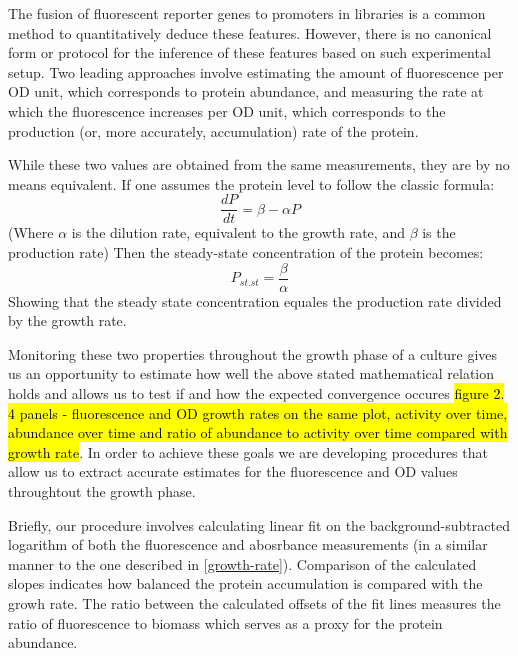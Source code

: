 \documentclass{report}
\begin{document}
The fusion of fluorescent reporter genes to promoters in libraries is a common method to quantitatively deduce these features.
However, there is no canonical form or protocol for the inference of these features based on such experimental setup.
Two leading approaches involve estimating the amount of fluorescence per OD unit, which corresponds to protein abundance, and measuring the rate at which the fluorescence increases per OD unit, which corresponds to the production (or, more accurately, accumulation) rate of the protein.

While these two values are obtained from the same measurements, they are by no means equivalent.
If one assumes the protein level to follow the classic formula:
\[ \frac{dP}{dt}=\beta-\alpha P\]
(Where $\alpha$ is the dilution rate, equivalent to the growth rate, and $\beta$ is the production rate)
Then the steady-state concentration of the protein becomes:
\[ P_{st.st}=\frac{\beta}{\alpha}\]
Showing that the steady state concentration equales the production rate divided by the growth rate.

Monitoring these two properties throughout the growth phase of a culture gives us an opportunity to estimate how well the above stated mathematical relation holds and allows us to test if and how the expected convergence occures \hl{figure 2. 4 panels - fluorescence and OD growth rates on the same plot, activity over time, abundance over time and ratio of abundance to activity over time compared with growth rate}.
In order to achieve these goals we are developing procedures that allow us to extract accurate estimates for the fluorescence and OD values throughtout the growth phase.

Briefly, our procedure involves calculating linear fit on the background-subtracted logarithm of both the fluorescence and abosrbance measurements (in a similar manner to the one described in \ref{growth-rate}).
Comparison of the calculated slopes indicates how balanced the protein accumulation is compared with the growh rate.
The ratio between the calculated offsets of the fit lines measures the ratio of fluorescence to biomass which serves as a proxy for the protein abundance.
\end{document}
